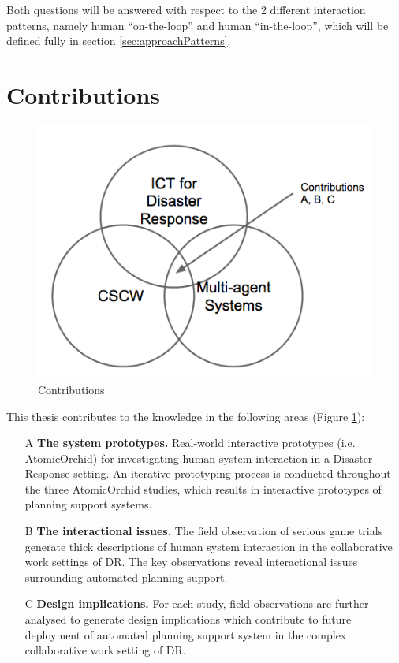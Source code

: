 Both questions will be answered with respect to the 2 different interaction patterns, namely human ``on-the-loop'' and human ``in-the-loop'', which will be defined fully in section \ref{sec:approachPatterns}. 

\section{Contributions} 
\begin{figure}[h]
  \centering
  \includegraphics[scale=0.5]{img/introduction/contributions.png}
  \caption{Contributions}
  \label{fig:contributions}
\end{figure}


This thesis contributes to the knowledge in the following areas (Figure \ref{fig:contributions}): \\

\begin{enumerate}
\item[A] \textbf{The system prototypes.} Real-world interactive prototypes (i.e. AtomicOrchid) for investigating human-system interaction in a Disaster Response setting. An iterative prototyping process is conducted throughout the three AtomicOrchid studies, which results in interactive prototypes of planning support systems. 
  
  \item[B] \textbf{The interactional issues.} The field observation of serious game trials generate thick descriptions of human system interaction in the collaborative work settings of \ac{DR}. The key observations reveal interactional issues surrounding automated planning support.
  
  \item[C] \textbf{Design implications.} For each study, field observations are further analysed to generate design implications which contribute to future deployment of automated planning support system in the complex collaborative work setting of \ac{DR}. 
\end{enumerate}


